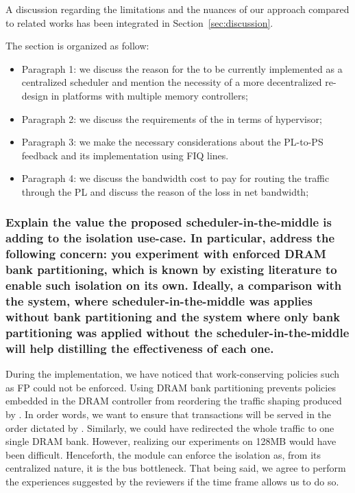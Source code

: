             A discussion regarding the limitations and the nuances of
            our approach compared to related works has been integrated
            in Section~\ref{sec:discussion}.

            The section is organized as follow:
            \begin{itemize}
                \item Paragraph 1: we discuss the reason for the \schim
                to be currently implemented as a centralized scheduler
                and mention the necessity of a more decentralized
                re-design in platforms with multiple memory
                controllers;

                \item Paragraph 2: we discuss the requirements of the \schim
                in terms of hypervisor;

                \item Paragraph 3: we make the necessary
                considerations about the PL-to-PS feedback and its
                implementation using FIQ lines.

                \item Paragraph 4: we discuss the bandwidth cost to
                pay for routing the traffic through the PL and discuss
                the reason of the loss in net bandwidth;
           \end{itemize}

        \subsubsection{Explain the value the proposed scheduler-in-the-middle is adding to the isolation use-case. In particular, address the following concern: you experiment with enforced DRAM bank partitioning, which is known by existing literature to enable such isolation on its own. Ideally, a comparison with the system, where scheduler-in-the-middle was applies without bank partitioning and the system where only bank partitioning was applied without the scheduler-in-the-middle will help distilling the effectiveness of each one.}
        During the implementation, we have noticed that work-conserving policies such as FP could not be enforced.
        Using DRAM bank partitioning prevents policies embedded in the DRAM controller from reordering the traffic shaping produced by \schim.
        In order words, we want to ensure that transactions will be served in the order dictated by \schim.
        Similarly, we could have redirected the whole traffic to one single DRAM bank. However, realizing our experiments on 128MB would have been difficult.
        Henceforth, the \schim module can enforce the isolation as, from its centralized nature, it is the bus bottleneck.
        That being said, we agree to perform the experiences suggested by the reviewers if the time frame allows us to do so.

